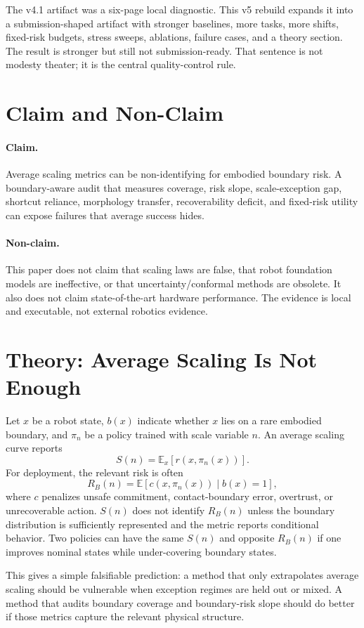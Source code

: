 \documentclass{article}
\begin{document}
The v4.1 artifact was a six-page local diagnostic. This v5 rebuild expands it into a submission-shaped artifact with stronger baselines, more tasks, more shifts, fixed-risk budgets, stress sweeps, ablations, failure cases, and a theory section. The result is stronger but still not submission-ready. That sentence is not modesty theater; it is the central quality-control rule.

\section{Claim and Non-Claim}
\paragraph{Claim.} Average scaling metrics can be non-identifying for embodied boundary risk. A boundary-aware audit that measures coverage, risk slope, scale-exception gap, shortcut reliance, morphology transfer, recoverability deficit, and fixed-risk utility can expose failures that average success hides.

\paragraph{Non-claim.} This paper does not claim that scaling laws are false, that robot foundation models are ineffective, or that uncertainty/conformal methods are obsolete. It also does not claim state-of-the-art hardware performance. The evidence is local and executable, not external robotics evidence.

\section{Theory: Average Scaling Is Not Enough}
Let $x$ be a robot state, $b(x)$ indicate whether $x$ lies on a rare embodied boundary, and $\pi_n$ be a policy trained with scale variable $n$. An average scaling curve reports
\[
S(n) = \mathbb{E}_x [r(x,\pi_n(x))].
\]
For deployment, the relevant risk is often
\[
R_B(n) = \mathbb{E}[c(x,\pi_n(x)) \mid b(x)=1],
\]
where $c$ penalizes unsafe commitment, contact-boundary error, overtrust, or unrecoverable action. $S(n)$ does not identify $R_B(n)$ unless the boundary distribution is sufficiently represented and the metric reports conditional behavior. Two policies can have the same $S(n)$ and opposite $R_B(n)$ if one improves nominal states while under-covering boundary states.

This gives a simple falsifiable prediction: a method that only extrapolates average scaling should be vulnerable when exception regimes are held out or mixed. A method that audits boundary coverage and boundary-risk slope should do better if those metrics capture the relevant physical structure.
\end{document}
